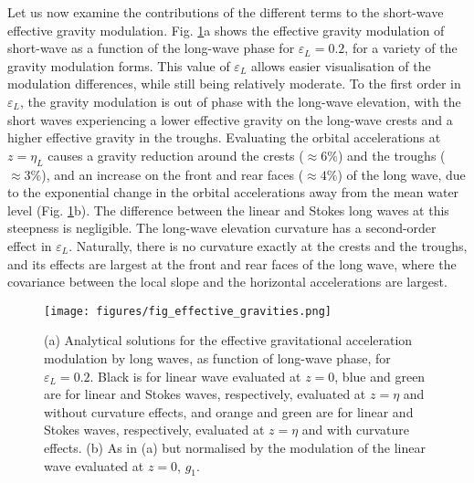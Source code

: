 \documentclass[lineno]{jfm}
\begin{document}
Let us now examine the contributions of the different terms to the short-wave
effective gravity modulation.
Fig. \ref{fig:effective_gravities}a shows the effective gravity modulation of
short-wave as a function of the long-wave phase for $\varepsilon_L = 0.2$, for
a variety of the gravity modulation forms.
This value of $\varepsilon_L$ allows easier visualisation of the modulation
differences, while still being relatively moderate.
To the first order in $\varepsilon_L$, the gravity modulation is out of phase
with the long-wave elevation, with the short waves experiencing a lower effective
gravity on the long-wave crests and a higher effective gravity in the troughs.
Evaluating the orbital accelerations at $z=\eta_L$ causes a gravity reduction
around the crests ($\approx6\%$) and the troughs ($\approx 3\%$), and an
increase on the front and rear faces ($\approx 4\%$) of the long wave, due to
the exponential change in the orbital accelerations away from the mean water level
(Fig. \ref{fig:effective_gravities}b).
The difference between the linear and Stokes long waves at this steepness is
negligible.
The long-wave elevation curvature has a second-order effect in $\varepsilon_L$.
Naturally, there is no curvature exactly at the crests and the troughs, and its
effects are largest at the front and rear faces of the long wave, where the
covariance between the local slope and the horizontal accelerations are largest.

\begin{figure}
\centering
\texttt{[image: figures/fig\_effective\_gravities.png]}
\caption{
  (a) Analytical solutions for the effective gravitational acceleration
  modulation by long waves, as function of long-wave phase, for $\varepsilon_L = 0.2$.
  Black is for linear wave evaluated at $z=0$,
  blue and green are for linear and Stokes waves, respectively, evaluated at $z=\eta$ and without curvature effects,
  and orange and green are for linear and Stokes waves, respectively, evaluated at $z=\eta$ and with curvature effects.
  (b) As in (a) but normalised by the modulation of the linear wave evaluated at $z=0$, $g_1$.
}
\label{fig:effective_gravities}
\end{figure}
\end{document}
